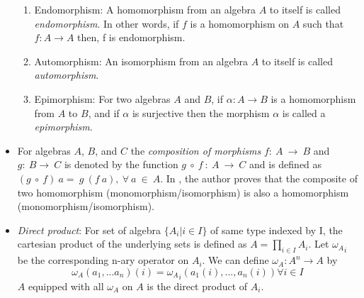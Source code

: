 \begin{itemize}
\begin{enumerate}
        \item Endomorphism: A homomorphism from an algebra $A$ to itself is
        called \textit{endomorphism}. In other words, if $f$ is a homomorphism on $A$
        such that $f:A\rightarrow A$ then, f is endomorphism.

        \item Automorphism: An isomorphism from an algebra $A$ to itself is
        called \textit{automorphism}.

        \item Epimorphism: For two algebras $A$ and $B$, if \(\alpha : A
        \rightarrow B \) is a homomorphism from $A$ to $B$, and if \(\alpha\) is
        surjective then the morphism \(\alpha\) is called a
        \textit{epimorphism}.
    \end{enumerate}

    \item For algebras $A$, $B$, and $C$ the \textit{composition of morphisms}
    $f:\ A \ \rightarrow \ B$ and $g:\ B \rightarrow\ C$ is denoted by the
    function $g\ \circ \ f\ :\ A\ \rightarrow \ C$ and is defined as $(g\ \circ \
    f)\ a = \ g\ (f\ a), \ \forall \ a\ \in\ A$. In \cite{sankappanavar1981course},
    the author proves that the composite of two homomorphism
    (monomorphism/isomorphism) is also a homomorphism
    (monomorphism/isomorphism).

    \item \textit{Direct product}: For set of algebra $\{ A_i | i \in I \}$ of
    same type indexed by I, the cartesian product of the underlying sets is
    defined as $A = \displaystyle \prod_{i\in I} A_i$. Let ${\omega_A}_i$ be the
    corresponding n-ary operator on $A_i$. We can define $\omega_A : A^{n}
    \rightarrow A$ by \[ \omega_A(a_1,...a_n)(i) = {\omega_A}_i
    (a_1(i),...,a_n(i)) \forall i \in I\] $A$ equipped with all $\omega_A$ on
    $A$ is the direct product of $A_i$.

\end{itemize}

